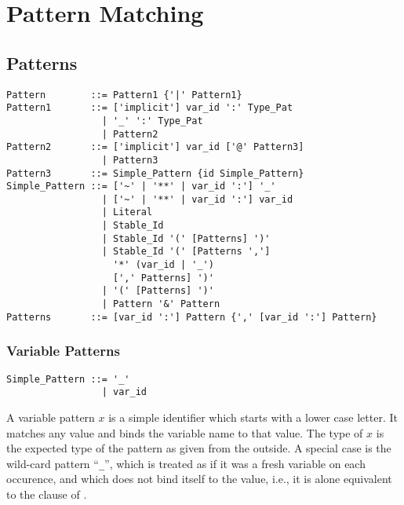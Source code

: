 
\chapter{Pattern Matching}
\label{sec:pattern-matching}






\section{Patterns}
\label{sec:patterns}

\syntax\begin{lstlisting}
Pattern        ::= Pattern1 {'|' Pattern1}
Pattern1       ::= ['implicit'] var_id ':' Type_Pat
                 | '_' ':' Type_Pat
                 | Pattern2
Pattern2       ::= ['implicit'] var_id ['@' Pattern3]
                 | Pattern3
Pattern3       ::= Simple_Pattern {id Simple_Pattern}
Simple_Pattern ::= ['~' | '**' | var_id ':'] '_'
                 | ['~' | '**' | var_id ':'] var_id
                 | Literal
                 | Stable_Id
                 | Stable_Id '(' [Patterns] ')' 
                 | Stable_Id '(' [Patterns ','] 
                   '*' (var_id | '_')
                   [',' Patterns] ')'
                 | '(' [Patterns] ')'
                 | Pattern '&' Pattern
Patterns       ::= [var_id ':'] Pattern {',' [var_id ':'] Pattern}
\end{lstlisting}






\subsection{Variable Patterns}
\label{sec:variable-patterns}

\syntax\begin{lstlisting}
Simple_Pattern ::= '_'
                 | var_id
\end{lstlisting}

A variable pattern $x$ is a simple identifier which starts with a lower case letter. It matches any value and binds the variable name to that value. The type of $x$ is the expected type of the pattern as given from the outside. A special case is the wild-card pattern ``\lstinline!_!'', which is treated as if it was a fresh variable on each occurence, and which does not bind itself to the value, i.e., it is alone equivalent to the  clause of . 






